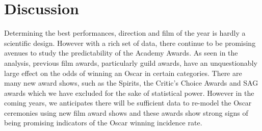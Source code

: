 \documentclass[jou,apacite]{apa6}
\begin{document}
\section{Discussion}
Determining the best performances, direction and film of the year is hardly a scientific design. However with a rich set of data, there continue to be promising avenues to study the predictability of the Academy Awards. As seen in the analysis, previous film awards, particularly guild awards, have an unquestionably large effect on the odds of winning an Oscar in certain categories. There are many new award shows, such as the Spirits, the Critic's Choice Awards and SAG awards which we have excluded for the sake of statistical power. However in the coming years, we anticipates there will be sufficient data to re-model the Oscar ceremonies using new film award shows and these awards show strong signs of being promising indicators of the Oscar winning incidence rate.

\appendix
\end{document}
